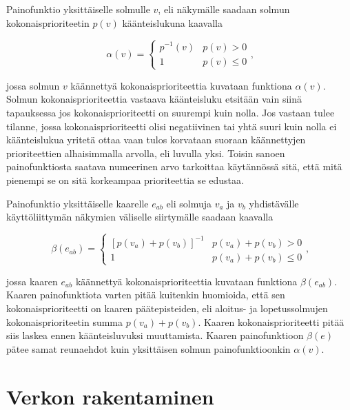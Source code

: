   Painofunktio yksittäiselle solmulle \(v\), eli näkymälle saadaan solmun kokonaisprioriteetin \(p(v)\) käänteislukuna kaavalla

  \begin{equation} \label{eq:5_4_2}
    \alpha(v) = \begin{cases}
      p^{-1}(v) & p(v) > 0 \\
      1 & p(v) \leq 0
    \end{cases}
    \text{,}
  \end{equation}

  jossa solmun \(v\) käännettyä kokonaisprioriteettia kuvataan funktiona \(\alpha(v)\).
  Solmun kokonaisprioriteettia vastaava käänteisluku etsitään vain siinä tapauksessa jos kokonaisprioriteetti on suurempi kuin nolla.
  Jos vastaan tulee tilanne, jossa kokonaisprioriteetti olisi negatiivinen tai yhtä suuri kuin nolla ei käänteislukua yritetä ottaa vaan tulos korvataan suoraan käännettyjen prioriteettien alhaisimmalla arvolla, eli luvulla yksi.
  Toisin sanoen painofunktiosta saatava numeerinen arvo tarkoittaa käytännössä sitä, että mitä pienempi se on sitä korkeampaa prioriteettia se edustaa.

  Painofunktio yksittäiselle kaarelle \(e_{ab}\) eli solmuja \(v_a\) ja \(v_b\) yhdistävälle käyttöliittymän näkymien väliselle siirtymälle saadaan kaavalla

  \begin{equation} \label{eq:5_4_3}
    \beta(e_{ab}) = \begin{cases}
      [p(v_a) + p(v_b)]^{-1} & p(v_a) + p(v_b) > 0 \\
      1 & p(v_a) + p(v_b) \leq 0
    \end{cases}
    \text{,}
  \end{equation}

  jossa kaaren \(e_{ab}\) käännettyä kokonaisprioriteettia kuvataan funktiona \(\beta(e_{ab})\). Kaaren painofunktiota varten pitää kuitenkin huomioida, että sen kokonaisprioriteetti on kaaren päätepisteiden, eli aloitus- ja lopetussolmujen kokonaisprioriteetin summa \(p(v_a) + p(v_b)\).
  Kaaren kokonaisprioriteetti pitää siis laskea ennen käänteisluvuksi muuttamista.
  Kaaren painofunktioon \(\beta(e)\) pätee samat reunaehdot kuin yksittäisen solmun painofunktioonkin \(\alpha(v)\).

\section{Verkon rakentaminen} \label{ch:10_verkon_rakentaminen}

